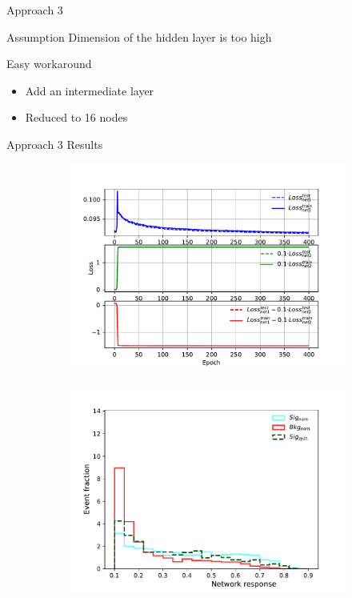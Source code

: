 \begin{frame}{Approach 3}
\begin{block}{Assumption}
    Dimension of the hidden layer is too high
\end{block}
\begin{block}{Easy workaround}
    \begin{itemize}
        \item Add an intermediate layer
        \item Reduced to 16 nodes
    \end{itemize}
\end{block}
\end{frame}

\begin{frame}{Approach 3 Results}
    \begin{figure}[htbp]
    \centering
    \begin{subfigure}[b]{0.47\textwidth}
        \includegraphics[width=\textwidth]{app3/app3_losses2.pdf}
        \label{fig:simple:final:sepa}
    \end{subfigure}
\quad
    \begin{subfigure}[b]{0.47\textwidth}
        \includegraphics[width=\textwidth]{app3/app3_syst.pdf}

\end{subfigure}
\end{figure}
\end{frame}
